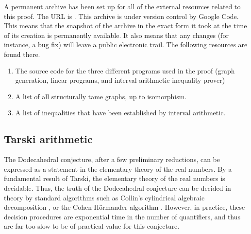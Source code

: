 A permanent archive has been set up for all of the external
resources related to this proof.  The URL is \cite{code}.
This archive is under version control by Google Code.  
This means that the snapshot of the archive in the
exact form it took at the time of its creation is permanently available.
It also means that any changes 
(for instance, a  bug fix) will leave
a public electronic trail.
The following resources are found there.
\begin{enumerate}
\item The source code for the three different programs used in the proof (graph generation, linear programs, and interval arithmetic inequality prover)
\item A list of all structurally tame graphs, up to isomorphism.
\item A list of inequalities that have been established by interval arithmetic.
\end{enumerate}

\subsection{Tarski arithmetic}


The Dodecahedral conjecture, after a few preliminary reductions, 
can be expressed as a statement
in the elementary theory of the real numbers.  By a fundamental
result of Tarski, the elementary theory of the real numbers
is decidable.  Thus, the
truth of the Dodecahedral 
conjecture can be decided in theory by standard
algorithms such as Collin's cylindrical algebraic decomposition \cite{Col}, or the Cohen-H\"ormander algorithm \cite{Hor}.  However,
in practice, these decision procedures are exponential time in the
number of quantifiers, and thus are far too slow to be of practical
value for this conjecture.

